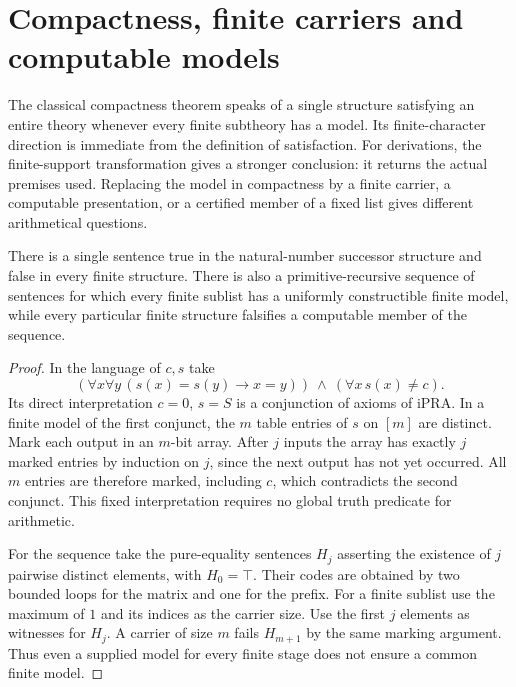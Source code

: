 \section{Compactness, finite carriers and computable models}\label{sec:compactness}
The classical compactness theorem speaks of a single structure satisfying an entire theory whenever every finite subtheory has a model. Its finite-character direction is immediate from the definition of satisfaction. For derivations, the finite-support transformation gives a stronger conclusion: it returns the actual premises used. Replacing the model in compactness by a finite carrier, a computable presentation, or a certified member of a fixed list gives different arithmetical questions.

\begin{proposition}
There is a single sentence true in the natural-number successor structure and false in every finite structure. There is also a primitive-recursive sequence of sentences for which every finite sublist has a uniformly constructible finite model, while every particular finite structure falsifies a computable member of the sequence.
\end{proposition}
\begin{proof}
In the language of $c,s$ take
\[
 (\forall x\forall y\,(s(x)=s(y)\to x=y))\ \land\
 (\forall x\,s(x)\ne c).
\]
Its direct interpretation $c=0$, $s=S$ is a conjunction of axioms of iPRA. In a finite model of the first conjunct, the $m$ table entries of $s$ on $[m]$ are distinct. Mark each output in an $m$-bit array. After $j$ inputs the array has exactly $j$ marked entries by induction on $j$, since the next output has not yet occurred. All $m$ entries are therefore marked, including $c$, which contradicts the second conjunct. This fixed interpretation requires no global truth predicate for arithmetic.

For the sequence take the pure-equality sentences $H_j$ asserting the existence of $j$ pairwise distinct elements, with $H_0=\top$. Their codes are obtained by two bounded loops for the matrix and one for the prefix. For a finite sublist use the maximum of $1$ and its indices as the carrier size. Use the first $j$ elements as witnesses for $H_j$. A carrier of size $m$ fails $H_{m+1}$ by the same marking argument. Thus even a supplied model for every finite stage does not ensure a common finite model.
\end{proof}

